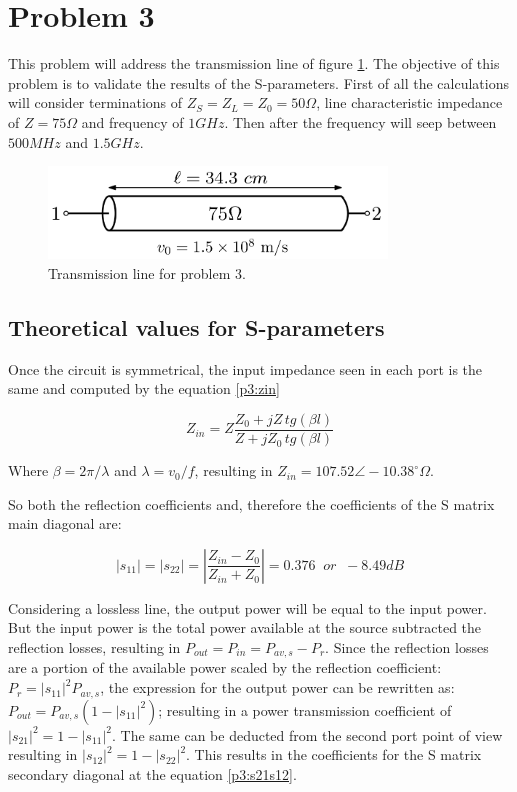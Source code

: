 \section{Problem 3}

This problem will address the transmission line of figure \ref{p3:line3}. The objective of this problem is to validate the results of the S-parameters. First of all the calculations will consider terminations of $Z_S = Z_L = Z_0 = 50 \Omega$, line characteristic impedance of $Z=75 \Omega$ and frequency of $1 GHz$. Then after the frequency will seep between $500 MHz$ and $1.5 GHz$. 

\begin{figure}[H] 
\centering
\includegraphics[width=9cm]{images/line3.png}
\caption{Transmission line for problem 3.}
\label{p3:line3} 
\end{figure}

\subsection{Theoretical values for S-parameters}

Once the circuit is symmetrical, the input impedance seen in each port is the same and computed by the equation \ref{p3:zin}

\begin{equation} \label{p3:zin}
    Z_{in} = Z \frac{Z_0 + jZ \, tg(\beta l)}{Z + jZ_0 \, tg(\beta l)} 
\end{equation}

Where $\beta = 2\pi/\lambda$ and $\lambda = v_0/f$, resulting in $Z_{in} = 107.52 \angle -10.38 ^{\circ} \Omega$.

So both the reflection coefficients and, therefore the coefficients of the S matrix main diagonal are:

\begin{equation} \label{p3:s11s22}
    |s_{11}| = |s_{22}| = \left|\frac{Z_{in}-Z_0}{Z_{in}+Z_0}\right| = 0.376 \; \; or \; \; -8.49 dB
\end{equation}

Considering a lossless line, the output power will be equal to the input power. But the input power is the total power available at the source subtracted the reflection losses, resulting in $P_{out} = P_{in} = P_{av,s} - P_r$. Since the reflection losses are a portion of the available power scaled by the reflection coefficient: $P_r = |s_{11}|^2 P_{av,s}$, the expression for the output power can be rewritten as: $P_{out} = P_{av,s} (1-|s_{11}|^2)$; resulting in a power transmission coefficient of $|s_{21}|^2 = 1-|s_{11}|^2$. The same can be deducted from the second port point of view resulting in $|s_{12}|^2 = 1-|s_{22}|^2$. This results in the coefficients for the S matrix secondary diagonal at the equation \ref{p3:s21s12}.

